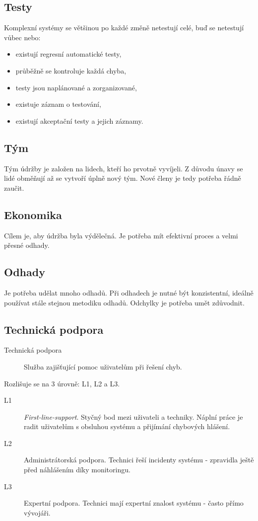   \subsection{Testy}
    Komplexní systémy se většinou po každé změně netestují celé, buď se netestují vůbec nebo:
    \begin{itemize}
      \item existují regresní automatické testy,
      \item průběžně se kontroluje každá chyba,
      \item testy jsou naplánované a zorganizované,
      \item existuje záznam o testování,
      \item existují akceptační testy a jejich záznamy.
    \end{itemize}

    \subsection{Tým}
      Tým údržby je založen na lidech, kteří ho prvotně vyvíjeli. Z důvodu únavy se lidé obměňují až se vytvoří úplně nový tým.
      Nové členy je tedy potřeba řádně zaučit.

    \subsection{Ekonomika}
      Cílem je, aby údržba byla výdělečná. Je potřeba mít efektivní proces a velmi přesné odhady.

    \subsection{Odhady}
      Je potřeba udělat mnoho odhadů. Při odhadech je nutné být konzistentní, ideálně používat stále stejnou metodiku odhadů.
      Odchylky je potřeba umět zdůvodnit.

    \subsection{Technická podpora}
      \begin{description}
        \item[Technická podpora] Služba zajišťující pomoc uživatelům při řešení chyb.
      \end{description}

      Rozlišuje se na 3 úrovně: L1, L2 a L3.

      \begin{description}
        \item[L1] \emph{First-line-support}. Styčný bod mezi uživateli a techniky. Náplní práce je radit uživatelům s obsluhou systému a přijímání chybových hlášení.
        \item[L2] Administrátorská podpora. Technici řeší incidenty systému - zpravidla ještě před náhlášením díky monitoringu.
        \item[L3] Expertní podpora. Technici mají expertní znalost systému - často přímo vývojáři.
      \end{description}

